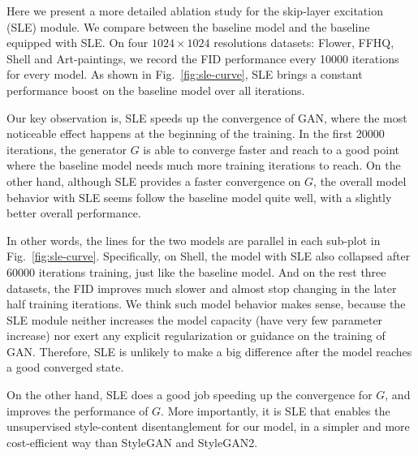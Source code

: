 \documentclass{article} \usepackage{iclr2021_conference,times}
\begin{document}
Here we present a more detailed ablation study for the skip-layer excitation (SLE) module. We compare between the baseline model and the baseline equipped with SLE. On four $1024\times1024$ resolutions datasets: Flower, FFHQ, Shell and Art-paintings, we record the FID performance every 10000 iterations for every model. As shown in Fig.~\ref{fig:sle-curve}, SLE brings a constant performance boost on the baseline model over all iterations.

Our key observation is, SLE speeds up the convergence of GAN, where the most noticeable effect happens at the beginning of the training. In the first 20000 iterations, the generator $G$ is able to converge faster and reach to a good point where the baseline model needs much more training iterations to reach. On the other hand, although SLE provides a faster convergence on $G$, the overall model behavior with SLE seems follow the baseline model quite well, with a slightly better overall performance. 

In other words, the lines for the two models are parallel in each sub-plot in Fig.~\ref{fig:sle-curve}. Specifically, on Shell, the model with SLE also collapsed after 60000 iterations training, just like the baseline model. And on the rest three datasets, the FID improves much slower and almost stop changing in the later half training iterations. We think such model behavior makes sense, because the SLE module neither increases the model capacity (have very few parameter increase) nor exert any explicit regularization or guidance on the training of GAN. Therefore, SLE is unlikely to make a big difference after the model reaches a good converged state.


On the other hand, SLE does a good job speeding up the convergence for $G$, and improves the performance of $G$. More importantly, it is SLE that enables the unsupervised style-content disentanglement for our model, in a simpler and more cost-efficient way than StyleGAN and StyleGAN2. 
\end{document}
